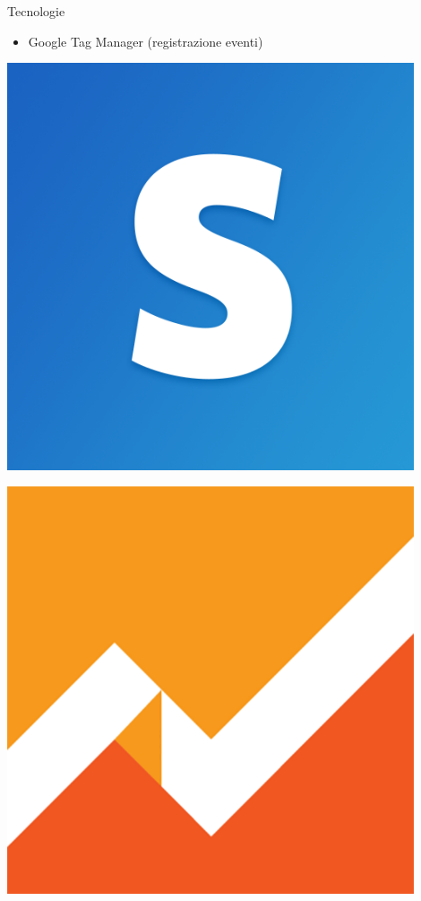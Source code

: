 \begin{frame}{Tecnologie}
\begin{minipage}{\textwidth}
\begin{minipage}{0.74\textwidth}
\begin{itemize}
						\item Google Tag Manager (registrazione eventi)
					\end{itemize}
				\end{minipage}
				\begin{minipage}{0.24\textwidth}
					\begin{minipage}{0.48\textwidth}
						\begin{flushright}
							\includegraphics[width=0.9\textwidth]{capitolo_2/immagini/stripe.png}
						\end{flushright}
					\end{minipage}
					\begin{minipage}{0.48\textwidth}
						\includegraphics[width=0.9\textwidth]{capitolo_2/immagini/google_analytics.png}

\end{minipage}
\end{minipage}
\end{minipage}
\end{frame}
